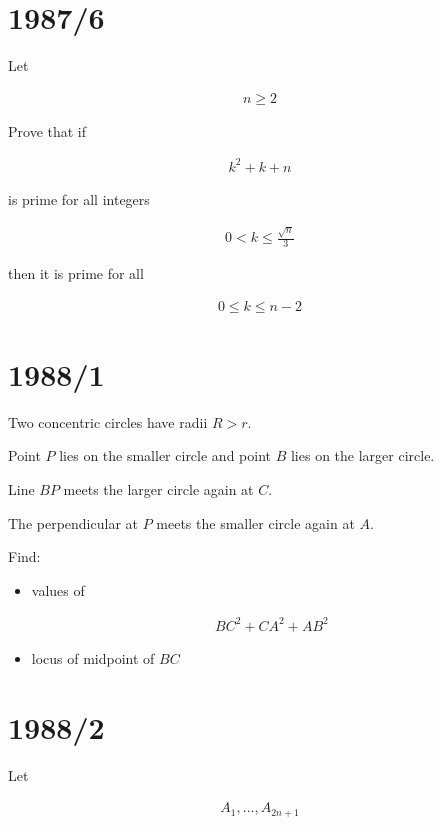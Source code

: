 \documentclass[12pt]{article}
\begin{document}
\section*{1987/6}

Let

\begin{align*}
n\geq2
\end{align*}

Prove that if

\begin{align*}
k^2+k+n
\end{align*}

is prime for all integers

\begin{align*}
0<k\leq\frac{\sqrt{n}}{3}
\end{align*}

then it is prime for all

\begin{align*}
0\leq k\leq n-2
\end{align*}

\section*{1988/1}

Two concentric circles have radii $R>r$.

Point $P$ lies on the smaller circle and point $B$ lies on the larger circle.

Line $BP$ meets the larger circle again at $C$.

The perpendicular at $P$ meets the smaller circle again at $A$.

Find:

\begin{itemize}

\item values of

\begin{align*}
BC^2+CA^2+AB^2
\end{align*}

\item locus of midpoint of $BC$

\end{itemize}

\section*{1988/2}

Let

\begin{align*}
A_1,\dots,A_{2n+1}
\end{align*}
\end{document}
